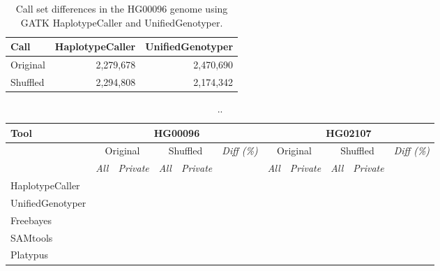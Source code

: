 
\begin{table}[htb]
\begin{center}
\begin{tabular}{|l|r|r|}
\hline
{\bf Call} & {\bf HaplotypeCaller} & {\bf UnifiedGenotyper}\\
\hline
Original & 2,279,678 & 2,470,690\\
Shuffled & 2,294,808 & 2,174,342 \\
\hline
\end{tabular}
\end{center}
\caption{Call set differences in the HG00096 genome using GATK HaplotypeCaller and UnifiedGenotyper.
}
\label{supptab:gatk-orig-shuf-lowcov}
\end{table}




\begin{table}[htb]
\begin{center}
\begin{tabular}{|l|c|c||c|c||c||c|c||c|c||c|}
\hline
{\bf Tool} & \multicolumn{5}{|c||}{\bf HG00096} & \multicolumn{5}{|c|}{\bf HG02107} \\
\hline
{\bf } & \multicolumn{2}{c||}{Original} & \multicolumn{2}{c||}{Shuffled} & {\it Diff (\%) }
& \multicolumn{2}{c||}{Original} & \multicolumn{2}{c||}{Shuffled} & {\it Diff (\%) } \\
\cline{2-11}
{\bf } & {\it All } & {\it Private } & {\it All } & {\it Private } & {\it }
& {\it All } & {\it Private } &  {\it All } & {\it Private } & {\it }\\
\hline
HaplotypeCaller & & & & & & & & & & \\
UnifiedGenotyper & & & & & & & & & & \\
Freebayes & & & & & & & & & & \\
SAMtools & & & & & & & & & & \\
Platypus & & & & & & & & & & \\
\hline
\end{tabular}
\end{center}
\caption{ .. }
\label{tab:snps-orig-vs-shuf}
\end{table}

